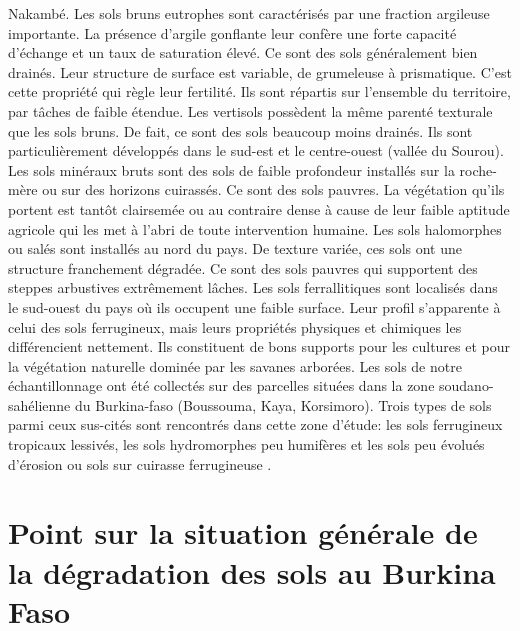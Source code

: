 \documentclass[a4paper,11pt]{article}
\begin{document}
Nakambé. Les sols bruns eutrophes sont caractérisés par une fraction
argileuse importante. La présence d'argile gonflante leur confère une
forte capacité d'échange et un taux de saturation élevé. Ce sont des
sols généralement bien drainés. Leur structure de surface est
variable, de grumeleuse à prismatique. C'est cette propriété qui règle
leur fertilité. Ils sont répartis sur l'ensemble du territoire, par
tâches de faible étendue. Les vertisols possèdent la même parenté
texturale que les sols bruns. De fait, ce sont des sols beaucoup moins
drainés. Ils sont particulièrement développés dans le sud-est et le
centre-ouest (vallée du Sourou). Les sols minéraux bruts sont des sols
de faible profondeur installés sur la roche-mère ou sur des horizons
cuirassés. Ce sont des sols pauvres. La végétation qu'ils portent est
tantôt clairsemée ou au contraire dense à cause de leur faible
aptitude agricole qui les met à l'abri de toute intervention
humaine. Les sols halomorphes ou salés sont installés au nord du
pays. De texture variée, ces sols ont une structure franchement
dégradée. Ce sont des sols pauvres qui supportent des steppes
arbustives extrêmement lâches. Les sols ferrallitiques sont localisés
dans le sud-ouest du pays où ils occupent une faible surface. Leur
profil s'apparente à celui des sols ferrugineux, mais leurs propriétés
physiques et chimiques les différencient nettement. Ils constituent de
bons supports pour les cultures et pour la végétation naturelle
dominée par les savanes arborées. Les sols de notre échantillonnage
ont été collectés sur des parcelles situées dans la zone
soudano-sahélienne du Burkina-faso (Boussouma, Kaya, Korsimoro). Trois
types de sols parmi ceux sus-cités sont rencontrés dans cette zone
d'étude: les sols ferrugineux tropicaux lessivés, les sols
hydromorphes peu humifères et les sols peu évolués d'érosion ou sols
sur cuirasse ferrugineuse \cite{TIROGO_2017}.

\section{Point sur la situation générale de la dégradation des sols au Burkina Faso}
\end{document}
